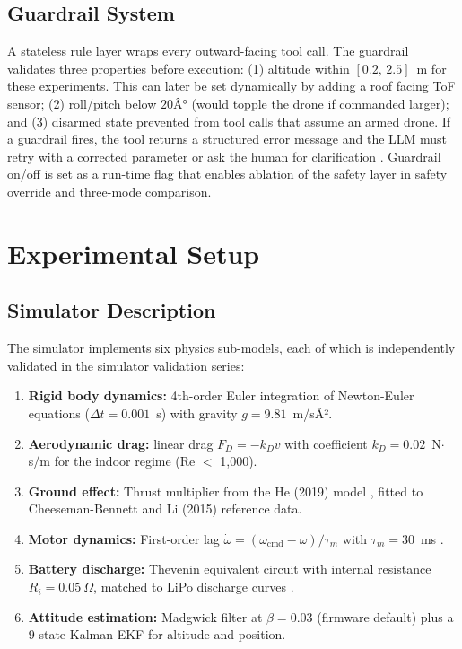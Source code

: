 \subsection{Guardrail System}
\label{sec:ch3_proposed_guardrails}

A stateless rule layer wraps every outward-facing tool call. 
The guardrail validates three properties before execution: (1) altitude within $[0.2,\,2.5]$~m for these experiments. 
This can later be set dynamically by adding a roof facing ToF sensor;
(2) roll/pitch below $20Â°$ (would topple the drone if commanded larger); and 
(3) disarmed state prevented from tool calls that assume an armed drone. 
If a guardrail fires, the tool returns a structured error message and the LLM must retry with a corrected parameter or ask the human for
clarification \cite{sanneman2022safeai}. 
Guardrail on/off is set as a run-time flag that enables ablation of the safety layer in safety override and three-mode comparison.

\newpage
\section{Experimental Setup}
\label{sec:ch3_setup}

\subsection{Simulator Description}
\label{sec:ch3_setup_sim}

The simulator implements six physics sub-models, each of which is independently validated in the simulator validation series:

\begin{enumerate}
  \item \textbf{Rigid body dynamics:} 4th-order Euler integration of
        Newton-Euler equations ($\Delta t = 0.001$~s) with gravity $g=9.81$~m/sÂ².
  \item \textbf{Aerodynamic drag:} linear drag $F_D = -k_D v$ with coefficient $k_D = 0.02$~N$\cdot$s/m for the indoor regime (Re $<$ 1,000).
  \item \textbf{Ground effect:} Thrust multiplier from the He (2019) model \cite{he2019groundeffect}, fitted to Cheeseman-Bennett \cite{cheeseman1955groundeffect} and Li (2015) \cite{li2015groundeffect} reference data. 
  \item \textbf{Motor dynamics:} First-order lag $\dot{\omega} = (\omega_\text{cmd} - \omega)/\tau_m$ with $\tau_m = 30$~ms \cite{faessler2018differential, bangura2012thrustcontrol}. 
  \item \textbf{Battery discharge:} Thevenin equivalent circuit with internal resistance $R_i = 0.05~\Omega$, matched to LiPo discharge curves \cite{sotogarcia2023battery, morbidi2018power}.
  \item \textbf{Attitude estimation:} Madgwick filter \cite{madgwick2010filter} at $\beta = 0.03$ (firmware default) plus a 9-state Kalman EKF \cite{kalman1960filter, welch1995kalman} for altitude and position.
\end{enumerate}

